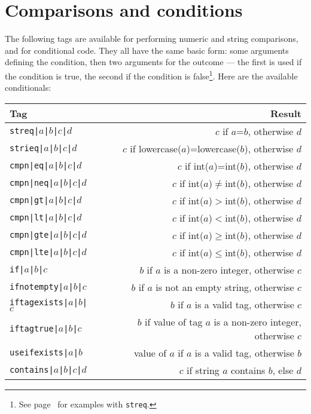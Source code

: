 \section{Comparisons and conditions}
The following tags are available for performing numeric and string
comparisons, and for conditional code. They all have the same basic
form: some arguments defining the condition, then two arguments for the
outcome --- the first is used if the condition is true, the second
if the condition is false\footnote{See page~\pageref{strequselab} for 
examples with \texttt{streq}.}. Here are the available conditionals:
\begin{center}
\begin{tabular}{lr}
\textbf{Tag} & \textbf{Result} \\
\hline
\texttt{streq|$a$|$b$|$c$|$d$} & $c$ if $a$=$b$, otherwise $d$ \\
\texttt{strieq|$a$|$b$|$c$|$d$} & $c$ if lowercase($a$)=lowercase($b$), otherwise $d$\\
\texttt{cmpn|eq|$a$|$b$|$c$|$d$} & $c$ if int($a$)=int($b$), otherwise $d$ \\
\texttt{cmpn|neq|$a$|$b$|$c$|$d$} & $c$ if int($a$)$\neq$int($b$), otherwise $d$ \\
\texttt{cmpn|gt|$a$|$b$|$c$|$d$} & $c$ if int($a$)$>$int($b$), otherwise $d$ \\
\texttt{cmpn|lt|$a$|$b$|$c$|$d$} & $c$ if int($a$)$<$int($b$), otherwise $d$ \\
\texttt{cmpn|gte|$a$|$b$|$c$|$d$} & $c$ if int($a$)$\geq$int($b$), otherwise $d$ \\
\texttt{cmpn|lte|$a$|$b$|$c$|$d$} & $c$ if int($a$)$\leq$int($b$), otherwise $d$ \\
\texttt{if|$a$|$b$|$c$} & $b$ if $a$ is a non-zero integer, otherwise $c$ \\
\texttt{ifnotempty|$a$|$b$|$c$} & $b$ if $a$ is not an empty string, otherwise $c$ \\
\texttt{iftagexists|$a$|$b$|$c$} & $b$ if $a$ is a valid tag, otherwise $c$ \\
\texttt{iftagtrue|$a$|$b$|$c$} & $b$ if value of tag $a$ is a non-zero integer, otherwise $c$ \\
\texttt{useifexists|$a$|$b$} & value of $a$ if $a$ is a valid tag, otherwise $b$ \\
\texttt{contains|$a$|$b$|$c$|$d$} & $c$ if string $a$ contains $b$, else $d$ \\
\end{tabular}
\end{center}

